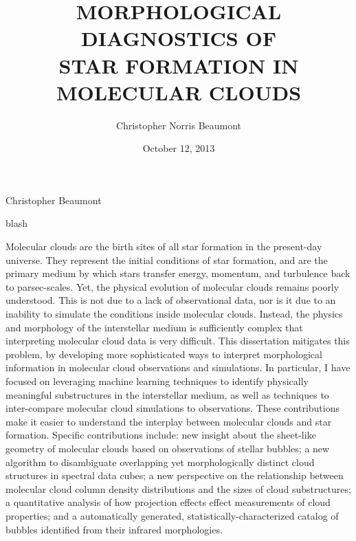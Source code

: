 \documentclass[]{uhthesis}
\begin{document}
\frontmatter

\title{MORPHOLOGICAL DIAGNOSTICS OF \\STAR FORMATION IN MOLECULAR CLOUDS}
\author{Christopher Norris Beaumont}
\date{October 12, 2013}
\maketitle
\makesig
{}
{Christopher Beaumont}

\makeacknowledgements
blash

\makeabstract
Molecular clouds are the birth sites of all star formation in the present-day universe. They represent the initial conditions of star formation, and are the primary medium by which stars transfer energy, momentum, and turbulence back to parsec-scales. Yet, the physical evolution of molecular clouds remains poorly understood. This is not due to a lack of observational data, nor is it due to an inability to simulate the conditions inside molecular clouds. Instead, the physics and morphology of the interstellar medium is sufficiently complex that interpreting molecular cloud data is very difficult. This dissertation mitigates this problem, by developing more sophisticated ways to interpret morphological information in molecular cloud observations and simulations. In particular, I have focused on leveraging machine learning techniques to identify physically meaningful substructures in the interstellar medium, as well as techniques to inter-compare molecular cloud simulations to observations.  These contributions make it easier to understand the interplay between molecular clouds and star formation. Specific contributions include: new insight about the sheet-like geometry of molecular clouds based on observations of stellar bubbles; a new algorithm to disambiguate overlapping yet morphologically distinct cloud structures in spectral data cubes; a new perspective on the relationship between molecular cloud column density distributions and the sizes of cloud substructures; a quantitative analysis of how projection effects effect measurements of cloud properties; and a automatically generated, statistically-characterized catalog of bubbles identified from their infrared morphologies.

\tableofcontents
\listoftables
\listoffigures

\mainmatter

\end{document}
